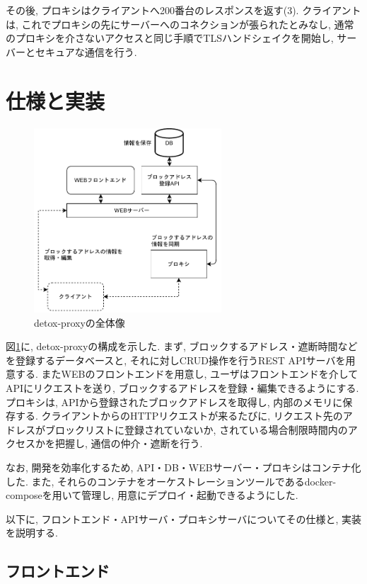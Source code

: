 \documentclass[10pt,a4paper,uplatex,a4j,dvipdfmx]{jsarticle}
\begin{document}
\begin{multicols}{2}
    その後, プロキシはクライアントへ200番台のレスポンスを返す(3).
    クライアントは, これでプロキシの先にサーバーへのコネクションが張られたとみなし, 通常のプロキシを介さないアクセスと同じ手順でTLSハンドシェイクを開始し, サーバーとセキュアな通信を行う.

    \section{仕様と実装}
    \begin{figure}[H]
      \center
      \includegraphics[width=7cm]{img/proxyall.pdf}
      \caption{detox-proxyの全体像 \label{img:proxy:all}}
    \end{figure}
    
    図\ref{img:proxy:all}に, detox-proxyの構成を示した.
    まず, ブロックするアドレス・遮断時間などを登録するデータベースと, それに対しCRUD操作を行うREST APIサーバを用意する. またWEBのフロントエンドを用意し, ユーザはフロントエンドを介してAPIにリクエストを送り, ブロックするアドレスを登録・編集できるようにする.
    プロキシは, APIから登録されたブロックアドレスを取得し, 内部のメモリに保存する. クライアントからのHTTPリクエストが来るたびに, リクエスト先のアドレスがブロックリストに登録されていないか, されている場合制限時間内のアクセスかを把握し, 通信の仲介・遮断を行う.
    
    なお, 開発を効率化するため, API・DB・WEBサーバー・プロキシはコンテナ化した.
    また, それらのコンテナをオーケストレーションツールであるdocker-composeを用いて管理し, 用意にデプロイ・起動できるようにした.
    
    以下に, フロントエンド・APIサーバ・プロキシサーバについてその仕様と, 実装を説明する.

    \subsection{フロントエンド}
    

\end{multicols}
\end{document}
